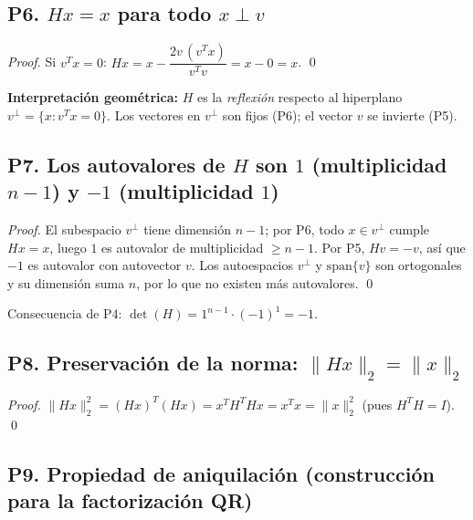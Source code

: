 \documentclass[11pt,a4paper]{article}
\begin{document}
\subsection{P6. $Hx = x$ para todo $x \perp v$}

\begin{proof}
Si $v^Tx = 0$: $Hx = x - \dfrac{2v\,(v^Tx)}{v^Tv} = x - 0 = x$. \qed
\end{proof}

\begin{tcolorbox}[info]
\textbf{Interpretación geométrica:} $H$ es la \emph{reflexión} respecto al hiperplano
$v^\perp = \{x : v^Tx = 0\}$. Los vectores en $v^\perp$ son fijos (P6);
el vector $v$ se invierte (P5).
\end{tcolorbox}

\subsection{P7. Los autovalores de $H$ son $1$ (multiplicidad $n-1$) y $-1$ (multiplicidad $1$)}

\begin{proof}
El subespacio $v^\perp$ tiene dimensión $n-1$; por P6, todo $x \in v^\perp$ cumple
$Hx = x$, luego $1$ es autovalor de multiplicidad $\ge n-1$.
Por P5, $Hv = -v$, así que $-1$ es autovalor con autovector $v$.
Los autoespacios $v^\perp$ y $\text{span}\{v\}$ son ortogonales y su dimensión suma
$n$, por lo que no existen más autovalores. \qed
\end{proof}

\begin{tcolorbox}[clave]
Consecuencia de P4: $\det(H) = 1^{n-1}\cdot(-1)^1 = -1$. \checkmark
\end{tcolorbox}

\subsection{P8. Preservación de la norma: $\|Hx\|_2 = \|x\|_2$}

\begin{proof}
$\|Hx\|_2^2 = (Hx)^T(Hx) = x^TH^THx = x^Tx = \|x\|_2^2$ (pues $H^TH=I$). \qed
\end{proof}

\subsection{P9. Propiedad de aniquilación (construcción para la factorización QR)}
\end{document}
